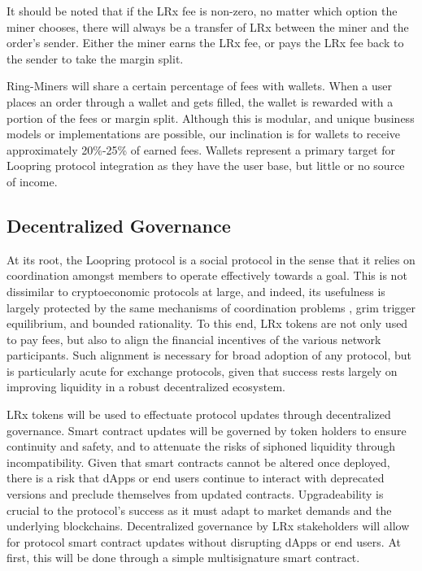 \documentclass[UTF8,nofonts]{article}
\begin{document}
\begin{multicols}{2}
It should be noted that if the LRx fee is non-zero, no matter which option the miner chooses, there will always be a transfer of LRx between the miner and the order's sender. Either the miner earns the LRx fee, or pays the LRx fee back to the sender to take the margin split.

Ring-Miners will share a certain percentage of fees with wallets. When a user places an order through a wallet and gets filled, the wallet is rewarded with a portion of the fees or margin split. Although this is modular, and unique business models or implementations are possible, our inclination is for wallets to receive approximately 20\%-25\% of earned fees. Wallets represent a primary target for Loopring protocol integration as they have the user base, but little or no source of income.

\subsection{Decentralized Governance}
At its root, the Loopring protocol is a social protocol in the sense that it relies on coordination amongst members to operate effectively towards a goal. This is not dissimilar to cryptoeconomic protocols at large, and indeed, its usefulness is largely protected by the same mechanisms of coordination problems \cite{vitalikgovernance}, grim trigger equilibrium, and bounded rationality. To this end, LRx tokens are not only used to pay fees, but also to align the financial incentives of the various network participants. Such alignment is necessary for broad adoption of any protocol, but is particularly acute for exchange protocols, given that success rests largely on improving liquidity in a robust decentralized ecosystem.

LRx tokens will be used to effectuate protocol updates through decentralized governance. Smart contract updates will be governed by token holders to ensure continuity and safety, and to attenuate the risks of siphoned liquidity through incompatibility. Given that smart contracts cannot be altered once deployed, there is a risk that dApps or end users continue to interact with deprecated versions and preclude themselves from updated contracts. Upgradeability is crucial to the protocol's success as it must adapt to market demands and the underlying blockchains. Decentralized governance by LRx stakeholders will allow for protocol smart contract updates without disrupting dApps or end users. At first, this will be done through a simple multisignature smart contract.


\end{multicols}
\end{document}
